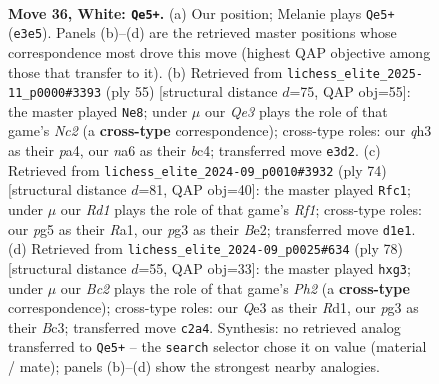 \documentclass[11pt]{article}
\begin{document}
\clearpage

\begin{figure}[p]\centering
\begin{subfigure}{0.46\textwidth}\centering
\resizebox{\linewidth}{!}{%
\newchessgame
\chessboard[
  setfen={1r6/pp4k1/n5p1/2pP1bp1/8/P3QPpq/1PB4P/2RR2K1 w - - 0 36},
  showmover=false,
  pgfstyle=straightmove, color=movearrow, markmove={e3-e5}
]}
\caption{}
\end{subfigure}\hfill
\begin{subfigure}{0.46\textwidth}\centering
\resizebox{\linewidth}{!}{%
\newchessgame
\chessboard[
  setfen={rr4k1/2n2p2/1q5p/2pPp3/P1B4p/1PN3Pb/2QB4/4R1K1 b - - 1 28},
  showmover=false,
  pgfstyle=straightmove, color=movearrow, markmove={c7-e8}
]}
\caption{}
\end{subfigure}
\\[4pt]
\begin{subfigure}{0.46\textwidth}\centering
\resizebox{\linewidth}{!}{%
\newchessgame
\chessboard[
  setfen={1r6/6bk/2q4p/p3pP2/5n2/P4Pp1/3QB1Pp/R4R1K w - - 0 38},
  showmover=false,
  pgfstyle=straightmove, color=movearrow, markmove={f1-c1}
]}
\caption{}
\end{subfigure}\hfill
\begin{subfigure}{0.46\textwidth}\centering
\resizebox{\linewidth}{!}{%
\newchessgame
\chessboard[
  setfen={b5k1/P3rqp1/3p4/2p5/2P1nPp1/2BQP1p1/7P/R2R2K1 w - - 0 40},
  showmover=false,
  pgfstyle=straightmove, color=movearrow, markmove={h2-g3}
]}
\caption{}
\end{subfigure}
\caption{\textbf{Move 36, White: \texttt{Qe5+}.} (a) Our position; Melanie plays \texttt{Qe5+} (\texttt{e3e5}). Panels (b)--(d) are the retrieved master positions whose correspondence most drove this move (highest QAP objective among those that transfer to it). (b) Retrieved from \texttt{lichess\_elite\_2025-11\_p0000\#3393} (ply 55) [structural distance $d$=75, QAP obj=55]: the master played \texttt{Ne8}; under $\mu$ our \emph{Qe3} plays the role of that game's \emph{Nc2} (a \textbf{cross-type} correspondence); cross-type roles: our \emph{q}h3 as their \emph{p}a4, our \emph{n}a6 as their \emph{b}c4; transferred move \texttt{e3d2}. (c) Retrieved from \texttt{lichess\_elite\_2024-09\_p0010\#3932} (ply 74) [structural distance $d$=81, QAP obj=40]: the master played \texttt{Rfc1}; under $\mu$ our \emph{Rd1} plays the role of that game's \emph{Rf1}; cross-type roles: our \emph{p}g5 as their \emph{R}a1, our \emph{p}g3 as their \emph{B}e2; transferred move \texttt{d1e1}. (d) Retrieved from \texttt{lichess\_elite\_2024-09\_p0025\#634} (ply 78) [structural distance $d$=55, QAP obj=33]: the master played \texttt{hxg3}; under $\mu$ our \emph{Bc2} plays the role of that game's \emph{Ph2} (a \textbf{cross-type} correspondence); cross-type roles: our \emph{Q}e3 as their \emph{R}d1, our \emph{p}g3 as their \emph{B}c3; transferred move \texttt{c2a4}. Synthesis: no retrieved analog transferred to \texttt{Qe5+} -- the \texttt{search} selector chose it on value (material / mate); panels (b)--(d) show the strongest nearby analogies.}
\label{fig:thought-m70}
\end{figure}
\end{document}
